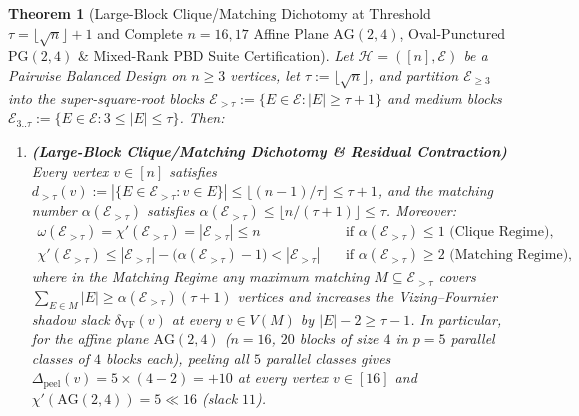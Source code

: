 \documentclass[11pt,reqno]{amsart}
\newtheorem{theorem}{Theorem}[section]
\theoremstyle{definition}
\theoremstyle{remark}
\begin{document}
\begin{theorem}[Large-Block Clique/Matching Dichotomy at Threshold $\tau = \lfloor\sqrt{n}\rfloor + 1$ and Complete $n = 16, 17$ Affine Plane $\mathrm{AG}(2,4)$, Oval-Punctured $\mathrm{PG}(2,4)$ \& Mixed-Rank PBD Suite Certification]\label{thm:large_block_tau_dichotomy}
Let $\mathcal{H} = ([n], \mathcal{E})$ be a Pairwise Balanced Design on $n \ge 3$ vertices, let $\tau := \lfloor\sqrt{n}\rfloor$, and partition $\mathcal{E}_{\ge 3}$ into the \emph{super-square-root blocks} $\mathcal{E}_{>\tau} := \{E \in \mathcal{E} : |E| \ge \tau + 1\}$ and medium blocks $\mathcal{E}_{3..\tau} := \{E \in \mathcal{E} : 3 \le |E| \le \tau\}$. Then:
\begin{enumerate}
  \item[\textup{(a)}] \textbf{(Large-Block Clique/Matching Dichotomy \& Residual Contraction)} Every vertex $v \in [n]$ satisfies $d_{>\tau}(v) := |\{E \in \mathcal{E}_{>\tau} : v \in E\}| \le \lfloor (n - 1)/\tau \rfloor \le \tau + 1$, and the matching number $\alpha(\mathcal{E}_{>\tau})$ satisfies $\alpha(\mathcal{E}_{>\tau}) \le \lfloor n / (\tau + 1) \rfloor \le \tau$. Moreover:
  \begin{equation}\label{eq:tau_dichotomy}
    \begin{aligned}
      \omega(\mathcal{E}_{>\tau}) = \chi'(\mathcal{E}_{>\tau}) = |\mathcal{E}_{>\tau}| \le n & \quad\text{if } \alpha(\mathcal{E}_{>\tau}) \le 1 \text{ (Clique Regime)},\\
      \chi'(\mathcal{E}_{>\tau}) \le |\mathcal{E}_{>\tau}| - \bigl(\alpha(\mathcal{E}_{>\tau}) - 1\bigr) < |\mathcal{E}_{>\tau}| & \quad\text{if } \alpha(\mathcal{E}_{>\tau}) \ge 2 \text{ (Matching Regime)},
    \end{aligned}
  \end{equation}
  where in the Matching Regime any maximum matching $M \subseteq \mathcal{E}_{>\tau}$ covers $\sum_{E \in M}|E| \ge \alpha(\mathcal{E}_{>\tau})(\tau + 1)$ vertices and increases the Vizing--Fournier shadow slack $\delta_{\mathrm{VF}}(v)$ at every $v \in V(M)$ by $|E| - 2 \ge \tau - 1$. In particular, for the affine plane $\mathrm{AG}(2,4)$ ($n = 16$, $20$ blocks of size $4$ in $p = 5$ parallel classes of $4$ blocks each), peeling all $5$ parallel classes gives $\Delta_{\mathrm{peel}}(v) = 5 \times (4 - 2) = +10$ at every vertex $v \in [16]$ and $\chi'(\mathrm{AG}(2,4)) = 5 \ll 16$ (slack $11$).

\end{enumerate}
\end{theorem}
\end{document}
